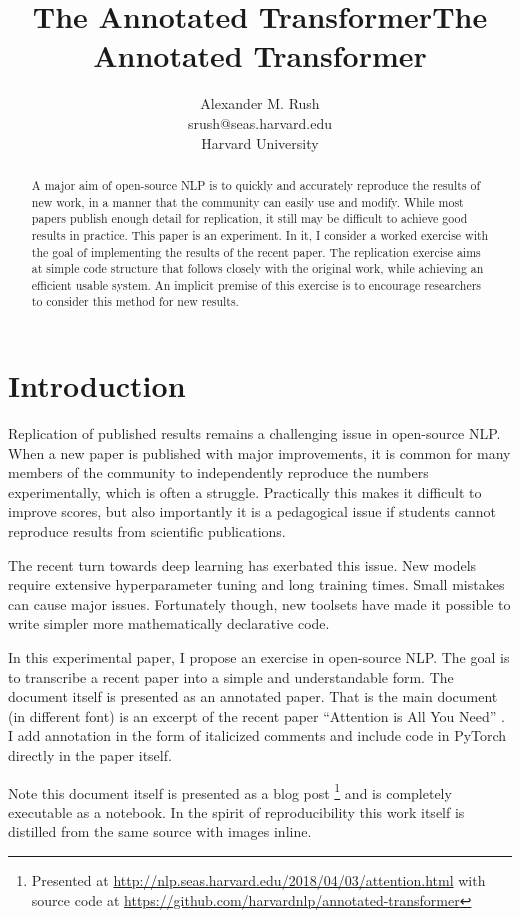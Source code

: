 \documentclass[11pt,a4paper]{article}
\title{The Annotated Transformer}
\author{Alexander M. Rush \\ srush@seas.harvard.edu \\ Harvard University}
\title{The Annotated Transformer}
\begin{document}
    \maketitle


\begin{abstract}
  A major aim of open-source NLP is to quickly and accurately
  reproduce the results of new work, in a manner that the community
  can easily use and modify. While most papers publish enough detail
  for replication, it still may be difficult to achieve good results
  in practice. This paper is an experiment. In it, I consider a worked
  exercise with the goal of implementing the results of the recent
  paper. The replication exercise aims at simple code structure that
  follows closely with the original work, while achieving an efficient
  usable system. An implicit premise of this exercise is to encourage
  researchers to consider this method for new results.
\end{abstract}

\section{Introduction}


Replication of published results remains a challenging issue
in open-source NLP. When a new paper is
published with major improvements, it is common for many
members of the community to independently  reproduce the
numbers experimentally, which is often a struggle. Practically this makes it difficult to improve
scores, but also importantly it is a pedagogical issue if students
cannot reproduce results from scientific publications.

The recent turn towards deep learning has exerbated this issue. New
models require extensive hyperparameter tuning and long training
times. Small mistakes can cause major issues.  Fortunately though, new
toolsets have made it possible to write simpler more mathematically
declarative code.

In this experimental paper, I propose an exercise in open-source
NLP. The goal is to transcribe a recent paper into a simple and
understandable form. The document itself is presented as
an annotated paper. That is the main document (in different font) is an excerpt of the recent paper ``Attention is All You Need''
\cite{DBLP:journals/corr/VaswaniSPUJGKP17}. I add annotation in the
form of italicized comments and include code in PyTorch directly in
the paper itself.

Note this document itself is presented as a blog post
\footnote{Presented at \url{http://nlp.seas.harvard.edu/2018/04/03/attention.html} with source code at \url{https://github.com/harvardnlp/annotated-transformer} } and is
completely executable as a notebook. In the spirit of reproducibility
this work itself is distilled from the same source with images
inline.
\end{document}
